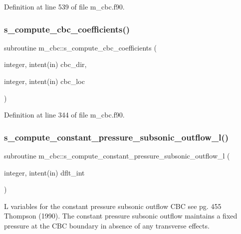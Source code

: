 Definition at line 539 of file m\+\_\+cbc.\+f90.

\mbox{\label{namespacem__cbc_aee8ead62642bc2783deb6403a961679d}} 
\subsubsection{\texorpdfstring{s\+\_\+compute\+\_\+cbc\+\_\+coefficients()}{s\_compute\_cbc\_coefficients()}}
{\footnotesize\ttfamily subroutine m\+\_\+cbc\+::s\+\_\+compute\+\_\+cbc\+\_\+coefficients (\begin{DoxyParamCaption}\item[{integer, intent(in)}]{cbc\+\_\+dir,  }\item[{integer, intent(in)}]{cbc\+\_\+loc }\end{DoxyParamCaption})}



Definition at line 344 of file m\+\_\+cbc.\+f90.

\mbox{\label{namespacem__cbc_abbe02209311e19efb816f7678a8a9584}} 
\subsubsection{\texorpdfstring{s\+\_\+compute\+\_\+constant\+\_\+pressure\+\_\+subsonic\+\_\+outflow\+\_\+l()}{s\_compute\_constant\_pressure\_subsonic\_outflow\_l()}}
{\footnotesize\ttfamily subroutine m\+\_\+cbc\+::s\+\_\+compute\+\_\+constant\+\_\+pressure\+\_\+subsonic\+\_\+outflow\+\_\+l (\begin{DoxyParamCaption}\item[{integer, intent(in)}]{dflt\+\_\+int }\end{DoxyParamCaption})}



L variables for the constant pressure subsonic outflow C\+BC see pg. 455 Thompson (1990). The constant pressure subsonic outflow maintains a fixed pressure at the C\+BC boundary in absence of any transverse effects. 


